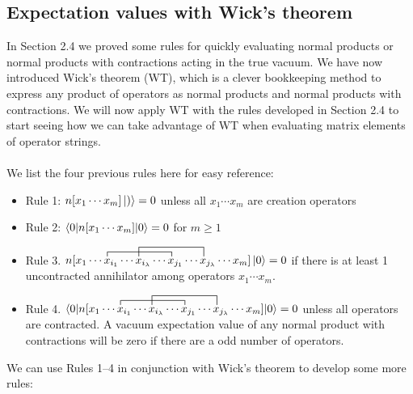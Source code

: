 \documentclass{article}
\newcommand{\cd}{\ensuremath{\cdots} }
\begin{document}
\subsection{Expectation values with Wick's theorem }
In Section 2.4 we proved some rules for quickly evaluating normal products or normal products with contractions acting in the true vacuum. 
We have now introduced Wick's theorem (WT), which is a clever bookkeeping method to express any product of operators as normal products and normal products with contractions. 
We will now apply WT with the rules developed in Section 2.4 to start seeing how we can take advantage of WT when evaluating matrix elements of operator strings. 
\\ \\
We list the four previous rules here for easy reference: 
\begin{itemize}
\item Rule 1: $n[x_1 \cd x_m]\ket{)} = 0$ unless all $x_1 \cd x_m$ are creation operators \\
\item Rule 2: $\braket{0 | n[x_1 \cd x_m] | 0} = 0$ for  $m \geq 1$ \\
\item Rule 3. $\contraction{n[x_1 \cd }{x}{{}_{i_1} \cd x_{i_\lambda} \cd }{x}
\contraction[2ex]{n[x_1 \cd x_{i_1} \cd}{ x}{{}_{i_\lambda} \cd x_{j_1} \cd }{x} 
n[x_1 \cd x_{i_1} \cd x_{i_\lambda} \cd x_{j_1} \cd x_{j_\lambda} \cd x_m] \ket{0} = 0$ if there is at least 1 uncontracted annihilator among operators $x_1 \cd x_m$.  \\
\item Rule 4. $\braket{0| \contraction{n[x_1 \cd }{x}{{}_{i_1} \cd x_{i_\lambda} \cd }{x}
\contraction[2ex]{n[x_1 \cd x_{i_1} \cd}{ x}{{}_{i_\lambda} \cd x_{j_1} \cd }{x} 
n[x_1 \cd x_{i_1} \cd x_{i_\lambda} \cd x_{j_1} \cd x_{j_\lambda} \cd x_m] |0} = 0$ unless all operators are contracted.
A vacuum expectation value of any normal product with contractions will be zero if there are a odd number of operators. \\
\end{itemize}

We can use Rules 1--4 in conjunction with Wick's theorem to develop some more rules: 
\end{document}

